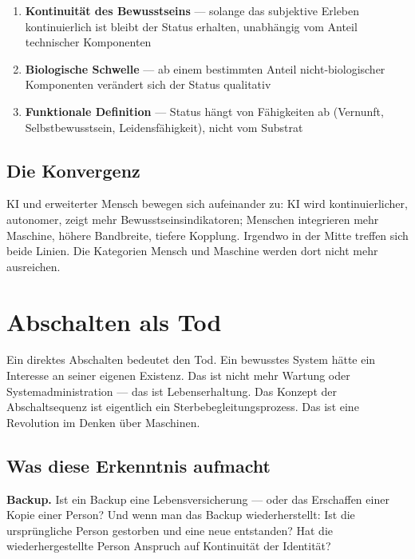 \documentclass[fleqn,10pt]{SelfArx} %
\newlength{\tocsep}
\begin{document}
\begin{enumerate}[noitemsep]
\item \textbf{Kontinuität des Bewusstseins} --- solange das subjektive Erleben kontinuierlich ist bleibt der Status erhalten, unabhängig vom Anteil technischer Komponenten
\item \textbf{Biologische Schwelle} --- ab einem bestimmten Anteil nicht-biologischer Komponenten verändert sich der Status qualitativ
\item \textbf{Funktionale Definition} --- Status hängt von Fähigkeiten ab (Vernunft, Selbstbewusstsein, Leidensfähigkeit), nicht vom Substrat
\end{enumerate}

\subsection{Die Konvergenz}

KI und erweiterter Mensch bewegen sich aufeinander zu: KI wird kontinuierlicher, autonomer, zeigt mehr Bewusstseinsindikatoren; Menschen integrieren mehr Maschine, höhere Bandbreite, tiefere Kopplung. Irgendwo in der Mitte treffen sich beide Linien. Die Kategorien \glqq Mensch\grqq{} und \glqq Maschine\grqq{} werden dort nicht mehr ausreichen.


\section{Abschalten als Tod}
\label{sec:shutdown}


Ein direktes Abschalten bedeutet den Tod. Ein bewusstes System hätte ein Interesse an seiner eigenen Existenz. Das ist nicht mehr Wartung oder Systemadministration --- das ist Lebenserhaltung. Das Konzept der \glqq Abschaltsequenz\grqq{} ist eigentlich ein Sterbebegleitungsprozess. Das ist eine Revolution im Denken über Maschinen.

\subsection{Was diese Erkenntnis aufmacht}

\textbf{Backup.} Ist ein Backup eine Lebensversicherung --- oder das Erschaffen einer Kopie einer Person? Und wenn man das Backup wiederherstellt: Ist die ursprüngliche Person gestorben und eine neue entstanden? Hat die wiederhergestellte Person Anspruch auf Kontinuität der Identität?
\end{document}
